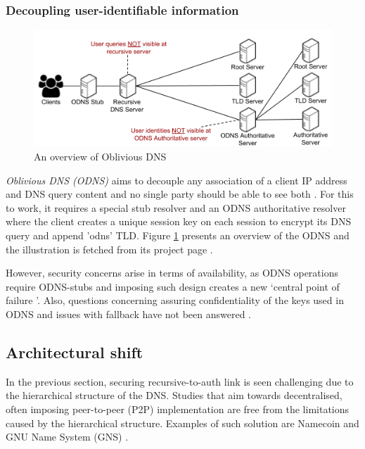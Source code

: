 \subsubsection{Decoupling user-identifiable information}
\begin{figure}[h!]
    \begin{center}
    \includegraphics*[width=0.9\columnwidth]{img/ODNSoverview}
    \end{center}
    \caption{An overview of Oblivious DNS \cite{ODNSwebsite}}
    \label{odnsoverview}
\end{figure}
\textit{Oblivious DNS (ODNS)} aims to decouple any association of a client IP address and DNS query content and no single party should be able to see both \cite{annee-dprive-oblivious-dns-00}.
For this to work, it requires a special stub resolver and an ODNS authoritative resolver where the client creates a unique session key on each session to encrypt its DNS query and append 'odns' TLD.
Figure \ref{odnsoverview} presents an overview of the ODNS and the illustration is fetched from its project page \cite{ODNSwebsite}.

However, security concerns arise in terms of availability, as ODNS operations require ODNS-stubs and imposing such design creates a new `central point of failure \cite{minutes-102-dprive}'.
Also, questions concerning assuring confidentiality of the keys used in ODNS and issues with fallback have not been answered \cite{minutes-102-dprive}. 

\subsection{Architectural shift}
In the previous section, securing recursive-to-auth link is seen challenging due to the hierarchical structure of the DNS.
Studies that aim towards decentralised, often imposing peer-to-peer (P2P) implementation are free from the limitations caused by the hierarchical structure.
Examples of such solution are Namecoin \cite{loibl2014namecoin} and GNU Name System (GNS) \cite{grothoff2017nsa, wachs2014censorship}.

